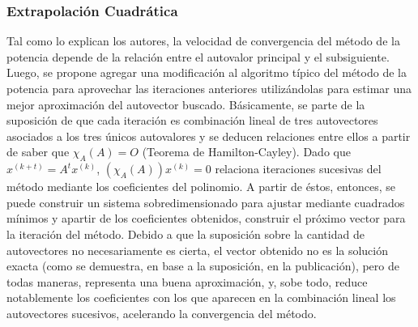 
\subsubsection{Extrapolación Cuadrática}
Tal como lo explican los autores, la velocidad de convergencia del método de la potencia depende  de la relación entre el autovalor principal  y el subsiguiente. Luego, se propone agregar una modificación al algoritmo típico del método de la potencia para aprovechar las iteraciones anteriores utilizándolas para estimar  una mejor aproximación del autovector buscado. Básicamente, se parte de la suposición de que cada iteración es combinación lineal de tres autovectores asociados a los tres únicos autovalores y se deducen relaciones entre ellos a partir de saber que $\chi_A(A) = O$ (Teorema de Hamilton-Cayley). Dado que $x^{(k+t)} = A^tx^{(k)}$, $(\chi_A(A))x^{(k)} = 0$ relaciona iteraciones sucesivas del método mediante los coeficientes del polinomio. A partir de éstos, entonces, se puede construir un sistema sobredimensionado para ajustar mediante cuadrados mínimos y apartir de los coeficientes obtenidos, construir el próximo vector para la iteración del método. Debido a que la suposición sobre la cantidad de autovectores no necesariamente es cierta, el vector obtenido no es la solución exacta (como se demuestra, en base a la suposición, en la publicación), pero de todas maneras, representa una buena aproximación, y, sobe todo, reduce notablemente los coeficientes con los que aparecen en la combinación lineal los autovectores sucesivos, acelerando la convergencia del método.
